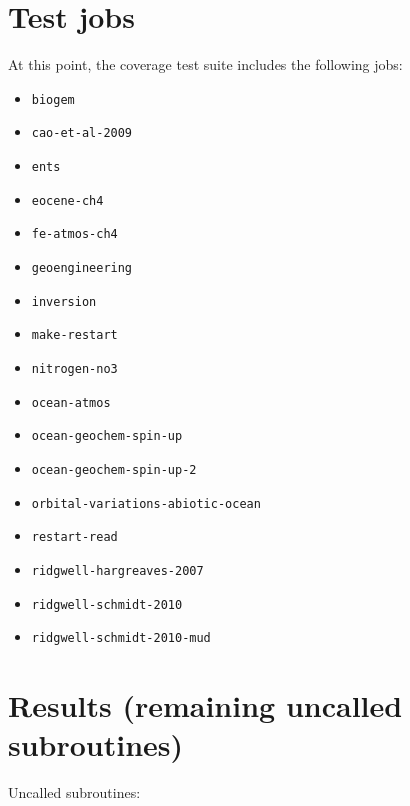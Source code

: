 \documentclass[a4paper,10pt,article]{memoir}
\begin{document}
\section{Test jobs}

At this point, the coverage test suite includes the following jobs:
\begin{itemize}
  \setlength\itemsep{0pt}
  \item{\texttt{biogem}}
  \item{\texttt{cao-et-al-2009}}
  \item{\texttt{ents}}
  \item{\texttt{eocene-ch4}}
  \item{\texttt{fe-atmos-ch4}}
  \item{\texttt{geoengineering}}
  \item{\texttt{inversion}}
  \item{\texttt{make-restart}}
  \item{\texttt{nitrogen-no3}}
  \item{\texttt{ocean-atmos}}
  \item{\texttt{ocean-geochem-spin-up}}
  \item{\texttt{ocean-geochem-spin-up-2}}
  \item{\texttt{orbital-variations-abiotic-ocean}}
  \item{\texttt{restart-read}}
  \item{\texttt{ridgwell-hargreaves-2007}}
  \item{\texttt{ridgwell-schmidt-2010}}
  \item{\texttt{ridgwell-schmidt-2010-mud}}
\end{itemize}

\section{Results (remaining uncalled subroutines)}

Uncalled subroutines:
\end{document}
